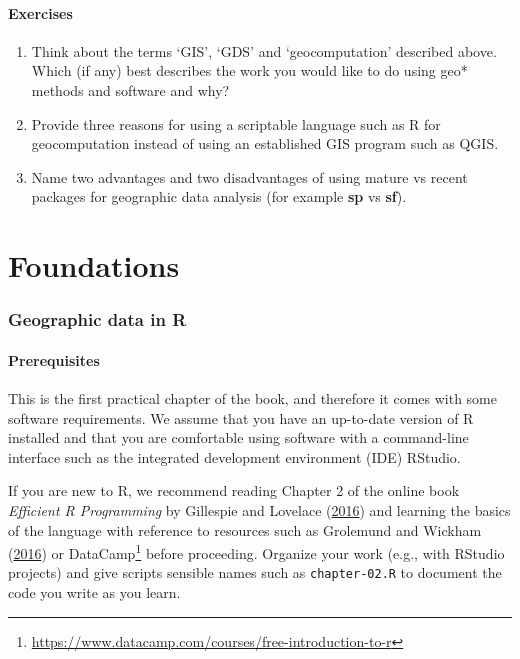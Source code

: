 \documentclass[]{krantz}
\let\rmarkdownfootnote\footnote%
\def\footnote{\protect\rmarkdownfootnote}
\renewcommand{\href}[2]{#2\footnote{\url{#1}}}
\begin{document}
\hypertarget{exercises}{%
\subsection{Exercises}\label{exercises}}

\begin{enumerate}
\def\labelenumi{\arabic{enumi}.}
\item
  Think about the terms `GIS', `GDS' and `geocomputation' described above. Which (if any) best describes the work you would like to do using geo* methods and software and why?
\item
  Provide three reasons for using a scriptable language such as R for geocomputation instead of using an established GIS program such as QGIS.
\item
  Name two advantages and two disadvantages of using mature vs recent packages for geographic data analysis (for example \textbf{sp} vs \textbf{sf}).
\end{enumerate}

\hypertarget{part-foundations}{%
\part{Foundations}\label{part-foundations}}

\hypertarget{spatial-class}{%
\section{Geographic data in R}\label{spatial-class}}

\hypertarget{prerequisites}{%
\subsection*{Prerequisites}\label{prerequisites}}

This is the first practical chapter of the book, and therefore it comes with some software requirements.
We assume that you have an up-to-date version of R installed and that you are comfortable using software with a command-line interface such as the integrated development environment (IDE) RStudio.

If you are new to R, we recommend reading Chapter 2 of the online book \emph{Efficient R Programming} by Gillespie and Lovelace (\protect\hyperlink{ref-gillespie_efficient_2016}{2016}) and
learning the basics of the language with reference to resources such as Grolemund and Wickham (\protect\hyperlink{ref-grolemund_r_2016}{2016}) or \href{https://www.datacamp.com/courses/free-introduction-to-r}{DataCamp} before proceeding.
Organize your work (e.g., with RStudio projects) and give scripts sensible names such as \texttt{chapter-02.R} to document the code you write as you learn.
\end{document}
